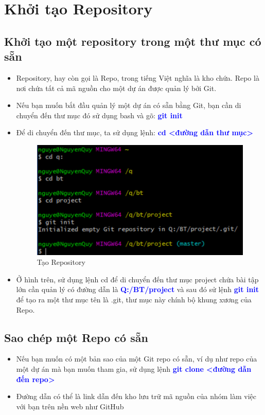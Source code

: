 \documentclass[12pt,a4paper]{report}
\begin{document}
\section{Khởi tạo Repository}

\subsection{Khởi tạo một repository trong một thư mục có sẵn}
\begin{itemize}
\item Repository, hay còn gọi là Repo, trong tiếng Việt nghĩa là kho chứa. Repo là nơi chứa tất cả mã nguồn cho một dự án được quản lý bởi Git.
\item Nếu bạn muốn bắt đầu quản lý một dự án có sẵn bằng Git, bạn cần di chuyển đến thư mục đó sử dụng bash và gõ: \textcolor{blue}{\bf git init}
\item Để di chuyển đến thư mục, ta sử dụng lệnh: \textcolor{blue}{\bf cd <đường dẫn thư mục> }

\begin{figure}[!ht]
	\centering
	\includegraphics[width=0.8\linewidth]{screenshot005}
\caption{Tạo Repository}
	\label{fig:screenshot005}
\end{figure}

\item Ở hình trên, sử dụng lệnh cd để di chuyển đến thư mục project chứa bài tập lớn cần quản lý có đường dẫn là \textcolor{blue}{\bf Q:/BT/project} và sau đó sử lệnh \textcolor{blue}{\bf git init} để tạo ra một thư mục tên là .git, thư mục này chính bộ khung xương của Repo.
\end{itemize}
\subsection{Sao chép một Repo có sẵn}
\begin{itemize}
\item Nếu bạn muốn có một bản sao của một Git repo có sẵn, ví dụ như repo của một dự án mà bạn muốn tham gia, sử dụng lệnh \textcolor{blue}{\bf git clone <đường dẫn đến repo>}
\item Đường dẫn có thể là link dẫn đến kho lưu trữ mã nguồn của nhóm làm việc với bạn trên nền web như GitHub
\end{itemize}
\end{document}
